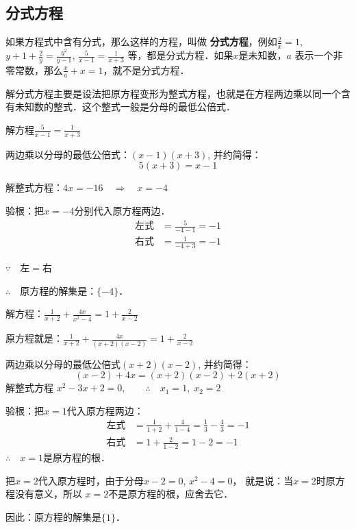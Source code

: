 \subsection{分式方程}
如果方程式中含有分式，那么这样的方程，叫做
\textbf{分式方程}，例如$\frac{2}{x}=1$, $y+1+\frac{2}{y}=\frac{y^2}{y-1}$, $\frac{5}{x-1}=\frac{1}{x+3}$
等，都是分式方程．如果$x$是未知数，$a$
表示一个非零常数，那么$\frac{x}{a}+x=1$，就不是分式方程．

解分式方程主要是设法把原方程变形为整式方程，也就是在方程两边乘以同一个含有未知数的整式．这个整式一般是分母的最低公倍式．



\begin{example}
 解方程$\frac{5}{x-1}=\frac{1}{x+3}$  
\end{example}

\begin{solution}
两边乘以分母的最低公倍式：$(x-1)(x+3)$, 并约简得：
\[5(x+3)=x-1\]

解整式方程：$4x=-16\quad \Rightarrow\quad x=-4$

验根：把$x=-4$分别代入原方程两边．
\[\begin{split}
    \text{左式}&=\frac{5}{-4-1}=-1\\
    \text{右式}&=\frac{1}{-4+3}=-1  
\end{split}\]

$\because\quad \text{左}=\text{右}$

$\therefore\quad $原方程的解集是：$\{-4\}$．
\end{solution}


\begin{example}
解方程：$\frac{1}{x+2}+\frac{4x}{x^2-4}=1+\frac{2}{x-2}$
\end{example}

\begin{solution}
    原方程就是：$\frac{1}{x+2}+\frac{4x}{(x+2)(x-2)}=1+\frac{2}{x-2}$

    两边乘以分母的最低公倍式$(x+2)(x-2)$, 并约简得：
    \[(x-2)+4x=(x+2)(x-2)+2(x+2)\]
    解整式方程 $x^2-3x+2=0,\qquad \therefore\quad x_1=1,\;x_2=2$
    
    验根：把$x=1$代入原方程两边：
    \[\begin{split}
        \text{左式}&=\frac{1}{1+2}+\frac{4}{1-4}=\frac{1}{3}-\frac{4}{3}=-1\\
        \text{右式}&=1+\frac{2}{1-2}=1-2=-1
    \end{split}\]
    $\therefore\quad x=1$是原方程的根．

    把$x=2$代入原方程时，由于分母$x-2=0$, $x^2-4=0$，
    就是说：当$x=2$时原方程没有意义，所以 $x=2$不是原方程的根，应舍去它．

因此：原方程的解集是$\{1\}$．
\end{solution}

